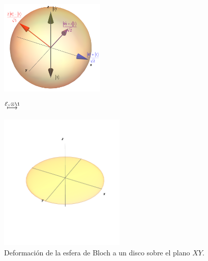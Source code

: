 \begin{figure}%
\centering
\begin{minipage}{.4\textwidth}
\centering
\includegraphics[width=5cm]
{img-congreso/bloch.png}
\end{minipage}
$\stackrel{\E_{z}\otimes\1 \vspace{1cm}}{\longmapsto}$
\begin{minipage}{0.4\textwidth}
\centering
\includegraphics[width=6cm]
{img-congreso/DiskXY}
\end{minipage}
\caption{
Deformación de la esfera de Bloch a un disco sobre el plano $XY$.}
\label{fig:qtm-op-motivation}
\end{figure} %


